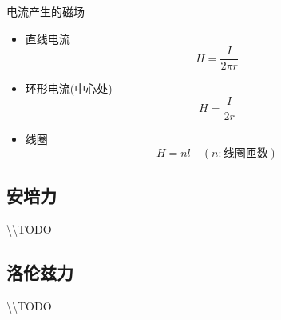 \begin{itembox}[l]{电流产生的磁场}
    \begin{itemize}
        \item 直线电流
        \begin{equation*}
            H=\frac{I}{2\pi r}
        \end{equation*}
        \item 环形电流(中心处)
        \begin{equation*}
            H=\frac{I}{2r}
        \end{equation*}
        \item 线圈
        \begin{equation*}
            H=nl\quad(n:\textrm{线圈匝数})
        \end{equation*}
    \end{itemize}
\end{itembox}

\subsection{安培力}

\textbackslash\textbackslash TODO

\subsection{洛伦兹力}

\textbackslash\textbackslash TODO
